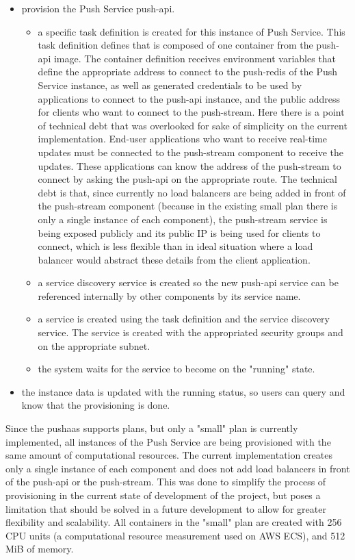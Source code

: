 \begin{itemize}
    \item provision the Push Service push-api.
        \begin{itemize}
            \item a specific task definition is created for this instance of Push Service. This task definition defines that is composed of one container from the push-api image. The container definition receives environment variables that define the appropriate address to connect to the push-redis of the Push Service instance, as well as generated credentials to be used by applications to connect to the push-api instance, and the public address for clients who want to connect to the push-stream. Here there is a point of technical debt that was overlooked for sake of simplicity on the current implementation. End-user applications who want to receive real-time updates must be connected to the push-stream component to receive the updates. These applications can know the address of the push-stream to connect by asking the push-api on the appropriate route. The technical debt is that, since currently no load balancers are being added in front of the push-stream component (because in the existing small plan there is only a single instance of each component), the push-stream service is being exposed publicly and its public IP is being used for clients to connect, which is less flexible than in ideal situation where a load balancer would abstract these details from the client application.
            \item a service discovery service is created so the new push-api service can be referenced internally by other components by its service name.
            \item a service is created using the task definition and the service discovery service. The service is created with the appropriated security groups and on the appropriate subnet.
            \item the system waits for the service to become on the "running" state.
        \end{itemize}
    \item the instance data is updated with the running status, so users can query and know that the provisioning is done.
\end{itemize}

Since the pushaas supports plans, but only a "small" plan is currently implemented, all instances of the Push Service are being provisioned with the same amount of computational resources. The current implementation creates only a single instance of each component and does not add load balancers in front of the push-api or the push-stream. This was done to simplify the process of provisioning in the current state of development of the project, but poses a limitation that should be solved in a future development to allow for greater flexibility and scalability. All containers in the "small" plan are created with 256 CPU units (a computational resource measurement used on AWS ECS), and 512 MiB of memory.


